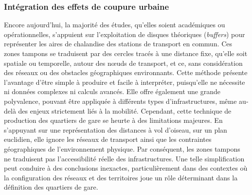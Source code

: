 \begin{refsegment}
\subsubsection*{Intégration des effets de coupure urbaine
    \label{chap3:quartiers-gare-isochrones-buffers}
    }

Encore aujourd’hui, la majorité des études, qu’elles soient académiques ou opérationnelles, s’appuient sur l'exploitation de disques théoriques (\textsl{buffers}) pour représenter les aires de chalandise des stations de transport en commun. Ces zones tampons se traduisent par des cercles tracés à une distance fixe, qu’elle soit spatiale ou temporelle, autour des nœuds de transport, et ce, sans considération des réseaux ou des obstacles géographiques environnants. Cette méthode présente l’avantage d’être simple à produire et facile à interpréter, puisqu’elle ne nécessite ni données complexes ni calculs avancés. Elle offre également une grande polyvalence, pouvant être appliquée à différents types d’infrastructures, même au-delà des enjeux strictement liés à la mobilité. Cependant, cette technique de production des quartiers de gare se heurte à des limitations majeures. En s’appuyant sur une représentation des distances à vol d’oiseau, sur un plan euclidien, elle ignore les réseaux de transport ainsi que les contraintes géographiques de l'environnement physique. Par conséquent, les zones tampons ne traduisent pas l’accessibilité réelle des infrastructures. Une telle simplification peut conduire à des conclusions inexactes, particulièrement dans des contextes où la configuration des réseaux et des territoires joue un rôle déterminant dans la définition des quartiers de gare.%


\end{refsegment}
